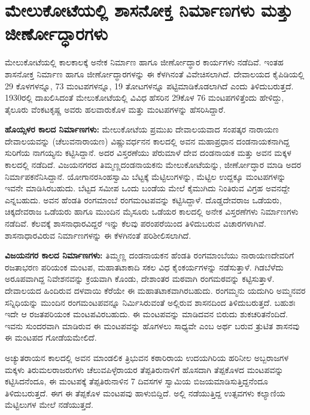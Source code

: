 \section{ಮೇಲುಕೋಟೆಯಲ್ಲಿ ಶಾಸನೋಕ್ತ ನಿರ್ಮಾಣಗಳು ಮತ್ತು ಜೀರ್ಣೋದ್ಧಾರಗಳು}

ಮೇಲುಕೋಟೆಯಲ್ಲಿ ಕಾಲಕಾಲಕ್ಕೆ ಅನೇಕ ನಿರ್ಮಾಣ ಹಾಗೂ ಜೀರ್ಣೋದ್ಧಾರ ಕಾರ್ಯಗಳು ನಡೆದಿವೆ. ಇಂತಹ ಶಾಸನೋಕ್ತ ನಿರ್ಮಾಣ ಹಾಗೂ ಜೀರ್ಣೋದ್ಧಾರಗಳನ್ನು ಈ ಕೆಳಗಿನಂತೆ ವಿವೇಚಿಸಲಾಗಿದೆ. ದೇವಾಲಯದ ಕೈಪಿಡಿಯಲ್ಲಿ 29 ಕೊಳಗಳನ್ನೂ, 73 ಮಂಟಪಗಳನ್ನೂ, 19 ತೋಟಗಳನ್ನೂ ಪಟ್ಟಿಮಾಡಿಕೊಡಲಾಗಿದೆ ಎಂದು ತಿಳಿದುಬರುತ್ತದೆ. 1930ರಲ್ಲಿ ದಾಖಲಿಸಿದಂತೆ ಮೇಲುಕೋಟೆಯಲ್ಲಿ ವಿವಿಧ ಹೆಸರಿನ 29ಕೊಳ 76 ಮಂಟಪಗಳಿತ್ತೆಂದು ಹೇಳಿದ್ದು, ತೈಲೂರು ವೆಂಕಟಕೃಷ್ಣ ಅವರು ಹಲವಾರುಕೊಳ ಮತ್ತು ಮಂಟಪಗಳನ್ನು ಹೆಸರಿಸಿದ್ದಾರೆ.

\textbf{ಹೊಯ್ಸಳರ ಕಾಲದ ನಿರ್ಮಾಣಗಳು:} ಮೇಲುಕೋಟೆಯ ಪ್ರಮುಖ ದೇವಾಲಯವಾದ ಸಂಪತ್ಕರ ನಾರಾಯಣ ದೇವಾಲಯವನ್ನು (ಚೆಲುವನಾರಾಯಣ) ವಿಷ್ಣುವರ್ಧನನ ಕಾಲದಲ್ಲಿ ಅವನ ಮಹಾಪ್ರಧಾನ ದಂಡನಾಯಕನಾಗಿದ್ದ ಸುರಿಗೆಯ ನಾಗಯ್ಯನು ಕಟ್ಟಿಸಿದ್ದಾನೆ. ಅದರ ವಿಸ್ತರಣೆಯು ಪೆರುಮಾಳೆ ದೇವ ದಂಡನಾಯಕ ಮತ್ತು ಅವನ ಮಕ್ಕಳ ಕಾಲದಲ್ಲಿ ನಡೆದಿದೆ. ವಿಜಯನಗರದ ತಿಮ್ಮಣ್ಣದಂಡನಾಯಕನು ಮೇಲುಕೋಟೆಯನ್ನು, ಜೀರ್ಣೋದ್ಧಾರ ಮಾಡಿ ಅದರ ನಿರ್ಮಾಪಕನೆನಿಸಿದ್ದಾನೆ. ಯೋಗಾನರಸಿಂಹಸ್ವಾಮಿ ಬೆಟ್ಟಕ್ಕೆ ಮೆಟ್ಟಿಲುಗಳನ್ನು, ಮೆಟ್ಟಿಲ ಉದ್ದಕ್ಕೂ ಮಂಟಪಗಳನ್ನು ಇವನೇ ಮಾಡಿಸಿರಬಹುದು. ಬೆಟ್ಟದ ಸಮೀಪ ಒಂದು ಬಂಡೆಯ ಮೇಲೆ ಕೈಮುಗಿದು ನಿಂತಿರುವ ವಿಗ್ರಹ ಅವನದ್ದೇ ಎನ್ನಬಹುದು. ಅವನ ಹೆಂಡತಿ ರಂಗಮಾಂಬೆ ರಂಗಮಂಟಪವನ್ನು ಕಟ್ಟಿಸಿದ್ದಾಳೆ. ದೊಡ್ಡದೇವರಾಜ ಒಡೆಯರು, ಚಿಕ್ಕದೇವರಾಜ ಒಡೆಯರು ಹಾಗೂ ಮುಂದಿನ ಮೈಸೂರು ಒಡೆಯರ ಕಾಲದಲ್ಲಿ ಅನೇಕ ವಿಸ್ತರಣೆಗಳು ನಿರ್ಮಾಣಗಳು ನಡೆದಿವೆ. ಕೆಲವಕ್ಕೆ ಶಾಸನಾಧಾರವಿದ್ದರೆ ಇನ್ನು ಕೆಲವು ಪರಂಪರೆಯಿಂದ ತಿಳಿದುಬರುವ ವಿಚಾರಗಳಾಗಿವೆ. ಶಾಸನಾಧಾರವಿರುವ ನಿರ್ಮಾಣಗಳನ್ನು ಈ ಕೆಳಗಿನಂತೆ ಪರಿಶೀಲಿಸಲಾಗಿದೆ. 

\textbf{ವಿಜಯನಗರ ಕಾಲದ ನಿರ್ಮಾಣಗಳು:} ತಿಮ್ಮಣ್ಣ ದಂಡನಾಯಕನ ಹೆಂಡತಿ ರಂಗಮಾಂಬೆಯು ನಾರಾಯಣದೇವರಿಗೆ ರಜತಾಭರಣ ಪರಿಯಂಕ ಮಂಟಪ, ಮಹಾತಟಾಕಾದಿ ಸಕಲ ವಿಧ ಕೈಂಕರ್ಯಗಳನ್ನು ನಡೆಸುತ್ತಾಳೆ. ಗಿಡಬೆಳೆದು ಅರೂಪವಾಗಿದ್ದ ನಿವೇಶನವನ್ನು ಕ್ರಯವಾಗಿ ಕೊಂಡು, ದೇಶಾಂತರ ಮಠವಾಗಿ ರಂಗಮಠವನ್ನು ಕಟ್ಟಿಸುತ್ತಾಳೆ. ದೇವಾಲಯದ ಹಿಂದಿರುವ ದಳವಾಯಿ ಕೆರೆಯೇ ಈ ಮಹಾತಟಾಕವಾಗಿರಬಹುದು. ರಂಗಮ್ಮನು ಯದುಗಿರಿ ಅಮ್ಮನವರ ಸನ್ನಿಧಿಯನ್ನು ಮುಂದಿನ ರಂಗಮಂಟಪವನ್ನೂ ನಿರ್ಮಿಸಿರುವಂತೆ ಅಲ್ಲಿರುವ ಶಾಸನದಿಂದ ತಿಳಿದುಬರುತ್ತದೆ. ಬಹುಶಃ ಇದೇ ಆ ರಜತಪರಿಯಂಕ ಮಂಟಪವಿರಬಹುದು. ಈ ಮಂಟಪವನ್ನು ಮಾಡಿದವನ ಬಿರುದು ಶುಕಚರಿತನೆಂದಿದೆ. ಇವನು ಸುಂದರವಾಗಿ ಮಾಡಿರುವ ಈ ಮಂಟಪವನ್ನು ಹೊಗಳಲು ಸಾಧ್ಯವೇ ಎಂಬ ಅರ್ಥ ಬರುವ ತ್ರುಟಿತ ಶಾಸನವು ಈ ಮಂಟಪದ ಗೋಡೆಯಮೇಲಿದೆ.

ಅಚ್ಯುತರಾಯನ ಕಾಲದಲ್ಲಿ ಅವನ ಮಾಂಡಲಿಕ ತ್ರಿಭುವನ ಕಠಾರಿರಾಯ ಉದಯಗಿರಿಯ ಹರಿನೀಲ ಅಬ್ಬರಾಜಗಳ ಮಕ್ಕಳು ತಿರುಮಲರಾಜರುಗಳು ಚೆಲುವಪಿಳ್ಳೆರಾಯರ ತೆಪ್ಪತಿರುನಾಳಿಗೆ ಹೊಸದಾಗಿ ತೆಪ್ಪಕೊಳದ ಮಂಟಪವನ್ನು ಕಟ್ಟಿಸಿದನೆಂದೂ, ಈ ಮಂಟಪಕ್ಕೆ ತೆಪ್ಪತಿರುನಾಳಿನ 7 ದಿವಸಗಳ ಸ್ವಾಮಿಯ ಬಿಜಯಮಾಡಿಸುತ್ತಿದ್ದನೆಂದೂ ತಿಳಿದುಬರುತ್ತದೆ. ಈಗ ಈ ತೆಪ್ಪಕೊಳ ಮಂಟಪವು ಹಾಳುಬಿದ್ದಿದೆ. ಅಲ್ಲಿ ನಡೆಯುತ್ತಿದ್ದ ಉತ್ಸವಗಳು ಕಲ್ಯಾಣಿಯ ಮೆಟ್ಟಿಲುಗಳ ಮೇಲೆ ನಡೆಯುತ್ತದೆ.

